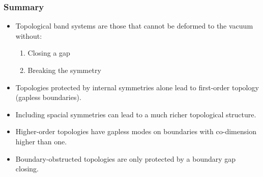 \documentclass{beamer}
\newcommand{\mc}{\mathcal}
\renewcommand{\(}{\left(}
\renewcommand{\)}{\right)}
\renewcommand{\[}{\left[}
\renewcommand{\]}{\right]}
\begin{document}
\begin{frame}
    \frametitle{Summary}

    \begin{itemize}
        \item Topological band systems are those that cannot be deformed to the vacuum without: \begin{enumerate}
            \item Closing a gap
            \item Breaking the symmetry
        \end{enumerate}
        \item Topologies protected by internal symmetries alone lead to first-order topology (gapless boundaries). 
        \item Including spacial symmetries can lead to a much richer topological structure. 
        \item Higher-order topologies have gapless modes on boundaries with co-dimension higher than one. 
        \item Boundary-obstructed topologies are only protected by a boundary gap closing. 
    \end{itemize}    

\end{frame}






\end{document}

